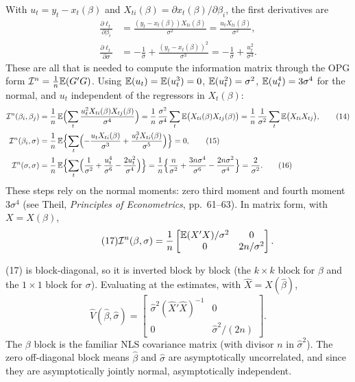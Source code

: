 \documentclass[11pt]{article}
\begin{document}
With $u_{t}=y_{t}-x_{t}(\beta)$ and $X_{ti}(\beta)=\partial x_{t}(\beta)/\partial\beta_{i}$, the first derivatives are
\begin{align*}
 \frac{\partial\ell_{t}}{\partial\beta_{i}}&=\frac{(y_{t}-x_{t}(\beta))X_{ti}(\beta)}{\sigma^{2}}=\frac{u_{t}X_{ti}(\beta)}{\sigma^{2}}, \tag{12}\\
 \frac{\partial\ell_{t}}{\partial\sigma}&=-\frac1\sigma+\frac{(y_{t}-x_{t}(\beta))^{2}}{\sigma^{3}}=-\frac1\sigma+\frac{u_{t}^{2}}{\sigma^{3}}. \tag{13}
\end{align*}
These are all that is needed to compute the information matrix through the OPG form
$\mathcal I^{n}=\frac1n\mathbb{E}(G'G)$. Using $\mathbb{E}(u_{t})=\mathbb{E}(u_{t}^{3})=0$, $\mathbb{E}(u_{t}^{2})=\sigma^{2}$, $\mathbb{E}(u_{t}^{4})=3\sigma^{4}$ for the
normal, and $u_{t}$ independent of the regressors in $X_{t}(\beta)$:
\begin{align*}
 \mathcal I^{n}(\beta_{i},\beta_{j})&=\frac1n\,\mathbb{E}\Bigl(\sum_{t}\frac{u_{t}^{2}X_{ti}(\beta)X_{tj}(\beta)}{\sigma^{4}}\Bigr)
   =\frac1n\,\frac{\sigma^{2}}{\sigma^{4}}\sum_{t}\mathbb{E}\bigl(X_{ti}(\beta)X_{tj}(\beta)\bigr)
   =\frac1n\,\frac1{\sigma^{2}}\sum_{t}\mathbb{E}\bigl(X_{ti}X_{tj}\bigr), \tag{14}\\
 \mathcal I^{n}(\beta_{i},\sigma)&=\frac1n\,\mathbb{E}\Bigl\{\sum_{t}\Bigl(-\frac{u_{t}X_{ti}(\beta)}{\sigma^{3}}+\frac{u_{t}^{3}X_{ti}(\beta)}{\sigma^{5}}\Bigr)\Bigr\}=0, \tag{15}\\
 \mathcal I^{n}(\sigma,\sigma)&=\frac1n\,\mathbb{E}\Bigl\{\sum_{t}\Bigl(\frac1{\sigma^{2}}+\frac{u_{t}^{4}}{\sigma^{6}}-\frac{2u_{t}^{2}}{\sigma^{4}}\Bigr)\Bigr\}
   =\frac1n\Bigl\{\frac n{\sigma^{2}}+\frac{3n\sigma^{4}}{\sigma^{6}}-\frac{2n\sigma^{2}}{\sigma^{4}}\Bigr\}=\frac2{\sigma^{2}}. \tag{16}
\end{align*}
These steps rely on the normal moments: zero third moment and fourth moment $3\sigma^{4}$
(see Theil, \emph{Principles of Econometrics}, pp.~61--63). In matrix form, with $X=X(\beta)$,
\begin{equation}\tag{17}
 \mathcal I^{n}(\beta,\sigma)=\frac1n\begin{bmatrix}\mathbb{E}(X'X)/\sigma^{2} & 0\\ 0 & 2n/\sigma^{2}\end{bmatrix}.
\end{equation}

(17) is block-diagonal, so it is inverted block by block (the $k\times k$ block for $\beta$ and
the $1\times1$ block for $\sigma$). Evaluating at the estimates, with $\hat X=X(\hat\beta)$,
\begin{equation}\tag{18}
 \widehat V(\hat\beta,\hat\sigma)=\begin{bmatrix}\hat\sigma^{2}(\hat X'\hat X)^{-1} & 0\\ 0 & \hat\sigma^{2}/(2n)\end{bmatrix}.
\end{equation}
The $\beta$ block is the familiar NLS covariance matrix (with divisor $n$ in $\hat\sigma^{2}$). The
zero off-diagonal block means $\hat\beta$ and $\hat\sigma$ are asymptotically uncorrelated, and since
they are asymptotically jointly normal, asymptotically independent.
\end{document}

